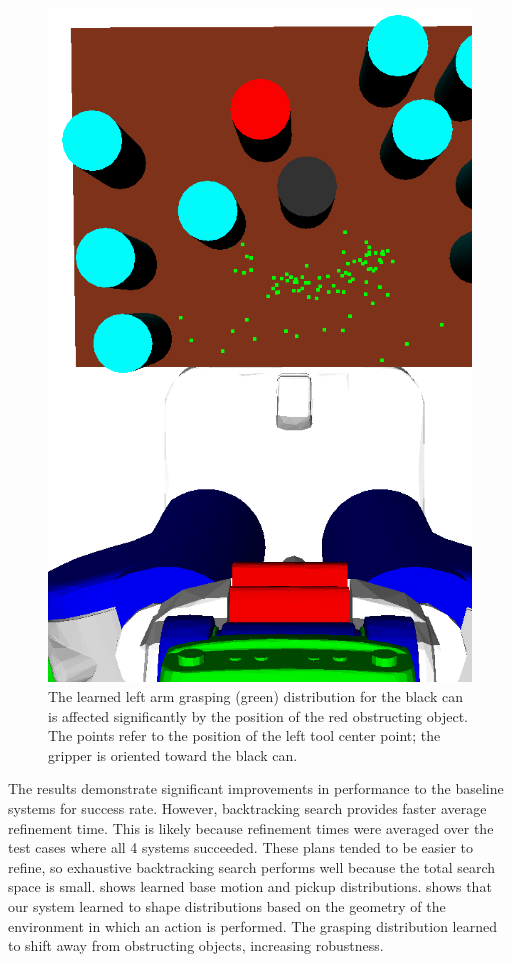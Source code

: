 \begin{figure}[t]
    \includegraphics[scale=0.13]{images/grasp_context_3.png}
  \caption{\small{The learned left arm grasping (green) distribution for the black can is affected significantly
by the position of the red obstructing object. The points refer to the position of the left tool center point; the gripper
is oriented toward the black can.}}
  \label{fig:context}
\end{figure}

The results demonstrate significant improvements in performance to the baseline systems for success rate.
However, backtracking search provides faster average refinement time. This is likely because
refinement times were averaged over the test cases where all 4 systems succeeded. These plans tended
to be easier to refine, so exhaustive backtracking search performs well because the total search space is small.
 shows learned base motion and pickup distributions.  shows
that our system learned to shape distributions based on the geometry of the environment in which an action
is performed. The grasping distribution learned to shift away from obstructing objects, increasing robustness.

